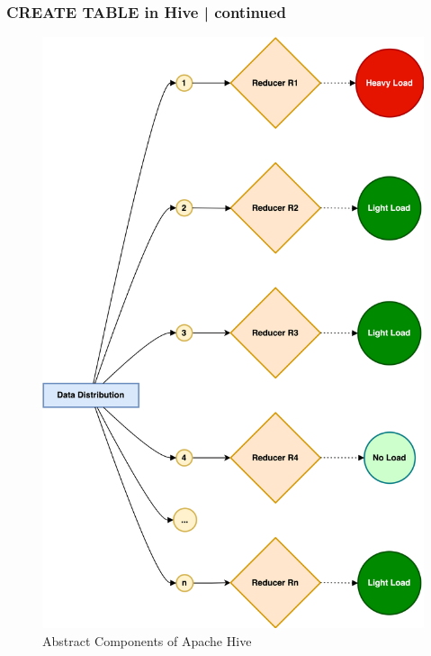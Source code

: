 		\begin{frame}
			\frametitle{CREATE TABLE in Hive | continued}  
			\vspace{-0.5cm}		
			\begin{tcolorbox}[colback=white,colframe=black,title= Part 7: Data Skewing]	
				\vspace{-0.3cm}
				\begin{figure}
					\includegraphics[width=\textwidth,height=.7\textheight,keepaspectratio]{./Figures/chapter-03/dwh_hive-skweed_dt_mr_2.png}	
					\caption{Abstract Components of Apache Hive}
				\end{figure}
				\vspace{-0.3cm}
			\end{tcolorbox}
		\end{frame}		
